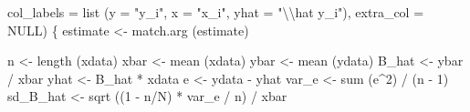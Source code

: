 \documentclass[
  letterpaper,
  DIV=11,
  numbers=noendperiod]{scrreprt}
\newenvironment{Shaded}{\begin{snugshade}}{\end{snugshade}}
\newcommand{\AttributeTok}[1]{\textcolor[rgb]{0.40,0.45,0.13}{#1}}
\newcommand{\ConstantTok}[1]{\textcolor[rgb]{0.56,0.35,0.01}{#1}}
\newcommand{\DecValTok}[1]{\textcolor[rgb]{0.68,0.00,0.00}{#1}}
\newcommand{\FunctionTok}[1]{\textcolor[rgb]{0.28,0.35,0.67}{#1}}
\newcommand{\NormalTok}[1]{\textcolor[rgb]{0.00,0.23,0.31}{#1}}
\newcommand{\OtherTok}[1]{\textcolor[rgb]{0.00,0.23,0.31}{#1}}
\newcommand{\SpecialCharTok}[1]{\textcolor[rgb]{0.37,0.37,0.37}{#1}}
\newcommand{\StringTok}[1]{\textcolor[rgb]{0.13,0.47,0.30}{#1}}
\renewcommand{\[}{\begin{equation}}
\renewcommand{\]}{\end{equation}}
\begin{document}
\begin{Shaded}
\begin{Highlighting}[]
                        \AttributeTok{col\_labels =} \FunctionTok{list}\NormalTok{ (}\AttributeTok{y =} \StringTok{"y\_i"}\NormalTok{, }\AttributeTok{x =} \StringTok{"x\_i"}\NormalTok{, }\AttributeTok{yhat =} \StringTok{"}\SpecialCharTok{\textbackslash{}\textbackslash{}}\StringTok{hat y\_i"}\NormalTok{),}
                        \AttributeTok{extra\_col =} \ConstantTok{NULL}\NormalTok{)}
\NormalTok{\{}
\NormalTok{  estimate }\OtherTok{\textless{}{-}} \FunctionTok{match.arg}\NormalTok{ (estimate)}

\NormalTok{  n }\OtherTok{\textless{}{-}} \FunctionTok{length}\NormalTok{ (xdata)}
\NormalTok{  xbar }\OtherTok{\textless{}{-}} \FunctionTok{mean}\NormalTok{ (xdata)}
\NormalTok{  ybar }\OtherTok{\textless{}{-}} \FunctionTok{mean}\NormalTok{ (ydata)}
\NormalTok{  B\_hat }\OtherTok{\textless{}{-}}\NormalTok{ ybar }\SpecialCharTok{/}\NormalTok{ xbar}
\NormalTok{  yhat }\OtherTok{\textless{}{-}}\NormalTok{ B\_hat }\SpecialCharTok{*}\NormalTok{ xdata}
\NormalTok{  e }\OtherTok{\textless{}{-}}\NormalTok{ ydata }\SpecialCharTok{{-}}\NormalTok{ yhat}
\NormalTok{  var\_e }\OtherTok{\textless{}{-}} \FunctionTok{sum}\NormalTok{ (e}\SpecialCharTok{\^{}}\DecValTok{2}\NormalTok{) }\SpecialCharTok{/}\NormalTok{ (n }\SpecialCharTok{{-}} \DecValTok{1}\NormalTok{)}
\NormalTok{  sd\_B\_hat }\OtherTok{\textless{}{-}} \FunctionTok{sqrt}\NormalTok{ ((}\DecValTok{1} \SpecialCharTok{{-}}\NormalTok{ n}\SpecialCharTok{/}\NormalTok{N) }\SpecialCharTok{*}\NormalTok{ var\_e }\SpecialCharTok{/}\NormalTok{ n) }\SpecialCharTok{/}\NormalTok{ xbar}


\end{Highlighting}
\end{Shaded}
\end{document}
